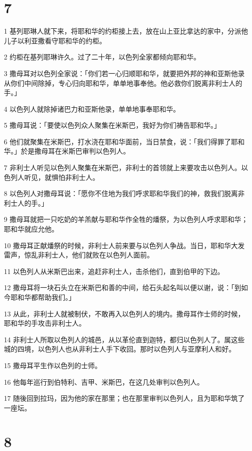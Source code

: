 \chapter{7}

\par 1 基列耶琳人就下来，将耶和华的约柜接上去，放在山上亚比拿达的家中，分派他儿子以利亚撒看守耶和华的约柜。
\par 2 约柜在基列耶琳许久。过了二十年，以色列全家都倾向耶和华。
\par 3 撒母耳对以色列全家说：「你们若一心归顺耶和华，就要把外邦的神和亚斯他录从你们中间除掉，专心归向耶和华，单单地事奉他。他必救你们脱离非利士人的手。」
\par 4 以色列人就除掉诸巴力和亚斯他录，单单地事奉耶和华。
\par 5 撒母耳说：「要使以色列众人聚集在米斯巴，我好为你们祷告耶和华。」
\par 6 他们就聚集在米斯巴，打水浇在耶和华面前，当日禁食，说：「我们得罪了耶和华。」於是撒母耳在米斯巴审判以色列人。
\par 7 非利士人听见以色列人聚集在米斯巴，非利士的首领就上来要攻击以色列人。以色列人听见，就惧怕非利士人。
\par 8 以色列人对撒母耳说：「愿你不住地为我们呼求耶和华我们的神，救我们脱离非利士人的手。」
\par 9 撒母耳就把一只吃奶的羊羔献与耶和华作全牲的燔祭，为以色列人呼求耶和华；耶和华就应允他。
\par 10 撒母耳正献燔祭的时候，非利士人前来要与以色列人争战。当日，耶和华大发雷声，惊乱非利士人，他们就败在以色列人面前。
\par 11 以色列人从米斯巴出来，追赶非利士人，击杀他们，直到伯甲的下边。
\par 12 撒母耳将一块石头立在米斯巴和善的中间，给石头起名叫以便以谢，说：「到如今耶和华都帮助我们。」
\par 13 从此，非利士人就被制伏，不敢再入以色列人的境内。撒母耳作士师的时候，耶和华的手攻击非利士人。
\par 14 非利士人所取以色列人的城邑，从以革伦直到迦特，都归以色列人了。属这些城的四境，以色列人也从非利士人手下收回。那时以色列人与亚摩利人和好。
\par 15 撒母耳平生作以色列的士师。
\par 16 他每年巡行到伯特利、吉甲、米斯巴，在这几处审判以色列人。
\par 17 随後回到拉玛，因为他的家在那里；也在那里审判以色列人，且为耶和华筑了一座坛。

\chapter{8}

